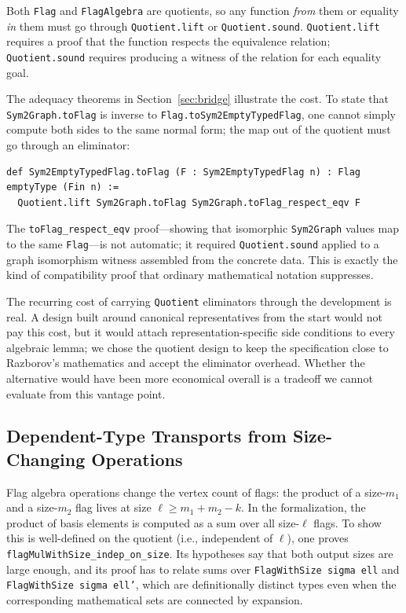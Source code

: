 \documentclass{article}
\newcommand{\lean}[1]{\texttt{#1}}
\begin{document}
Both \lean{Flag} and \lean{FlagAlgebra} are quotients, so any function
\emph{from} them or equality \emph{in} them must go through
\lean{Quotient.lift} or \lean{Quotient.sound}.  \lean{Quotient.lift} requires
a proof that the function respects the equivalence relation;
\lean{Quotient.sound} requires producing a witness of the relation for each
equality goal.

The adequacy theorems in Section~\ref{sec:bridge} illustrate the cost.
To state that \lean{Sym2Graph.toFlag} is inverse to
\lean{Flag.toSym2EmptyTypedFlag}, one cannot simply compute both sides to the
same normal form; the map out of the quotient must go through an eliminator:
\begin{lstlisting}
def Sym2EmptyTypedFlag.toFlag (F : Sym2EmptyTypedFlag n) : Flag emptyType (Fin n) :=
  Quotient.lift Sym2Graph.toFlag Sym2Graph.toFlag_respect_eqv F
\end{lstlisting}
The \lean{toFlag\_respect\_eqv} proof---showing that isomorphic
\lean{Sym2Graph} values map to the same \lean{Flag}---is not automatic; it
required \lean{Quotient.sound} applied to a graph isomorphism witness
assembled from the concrete data.  This is exactly the kind of compatibility
proof that ordinary mathematical notation suppresses.

The recurring cost of carrying \lean{Quotient} eliminators through the
development is real.  A design built around canonical representatives from the
start would not pay this cost, but it would attach representation-specific
side conditions to every algebraic lemma; we chose the quotient design to keep
the specification close to Razborov's mathematics and accept the eliminator
overhead.  Whether the alternative would have been more economical overall is
a tradeoff we cannot evaluate from this vantage point.

\subsection{Dependent-Type Transports from Size-Changing Operations}

Flag algebra operations change the vertex count of flags: the product of a
size-$m_1$ and a size-$m_2$ flag lives at size $\ell \geq m_1 + m_2 - k$.  In
the formalization, the product of basis elements is computed as a sum over
all size-$\ell$ flags.  To show this is well-defined on the quotient (i.e.,
independent of $\ell$), one proves \lean{flagMulWithSize\_indep\_on\_size}.
Its hypotheses say that both output sizes are large enough, and its proof has
to relate sums over \lean{FlagWithSize sigma ell} and
\lean{FlagWithSize sigma ell'}, which are definitionally distinct types even
when the corresponding mathematical sets are connected by expansion.
\end{document}
